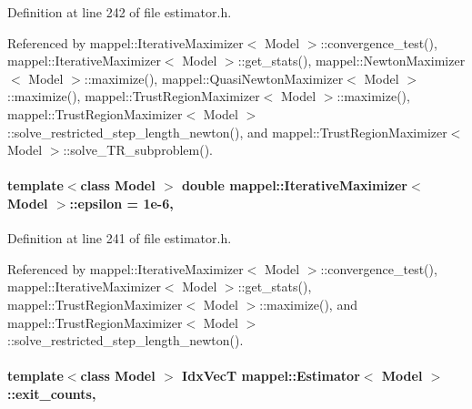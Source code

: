 Definition at line 242 of file estimator.\+h.



Referenced by mappel\+::\+Iterative\+Maximizer$<$ Model $>$\+::convergence\+\_\+test(), mappel\+::\+Iterative\+Maximizer$<$ Model $>$\+::get\+\_\+stats(), mappel\+::\+Newton\+Maximizer$<$ Model $>$\+::maximize(), mappel\+::\+Quasi\+Newton\+Maximizer$<$ Model $>$\+::maximize(), mappel\+::\+Trust\+Region\+Maximizer$<$ Model $>$\+::maximize(), mappel\+::\+Trust\+Region\+Maximizer$<$ Model $>$\+::solve\+\_\+restricted\+\_\+step\+\_\+length\+\_\+newton(), and mappel\+::\+Trust\+Region\+Maximizer$<$ Model $>$\+::solve\+\_\+\+T\+R\+\_\+subproblem().

\paragraph[{\texorpdfstring{epsilon}{epsilon}}]{\setlength{\rightskip}{0pt plus 5cm}template$<$class Model $>$ double {\bf mappel\+::\+Iterative\+Maximizer}$<$ Model $>$\+::epsilon = 1e-\/6\hspace{0.3cm}{\ttfamily [protected]}, {\ttfamily [inherited]}}\hypertarget{classmappel_1_1IterativeMaximizer_ae727ea0e3cab3924d21ebe9c12fec314}{}\label{classmappel_1_1IterativeMaximizer_ae727ea0e3cab3924d21ebe9c12fec314}


Definition at line 241 of file estimator.\+h.



Referenced by mappel\+::\+Iterative\+Maximizer$<$ Model $>$\+::convergence\+\_\+test(), mappel\+::\+Iterative\+Maximizer$<$ Model $>$\+::get\+\_\+stats(), mappel\+::\+Trust\+Region\+Maximizer$<$ Model $>$\+::maximize(), and mappel\+::\+Trust\+Region\+Maximizer$<$ Model $>$\+::solve\+\_\+restricted\+\_\+step\+\_\+length\+\_\+newton().

\paragraph[{\texorpdfstring{exit\+\_\+counts}{exit_counts}}]{\setlength{\rightskip}{0pt plus 5cm}template$<$class Model $>$ {\bf Idx\+VecT} {\bf mappel\+::\+Estimator}$<$ Model $>$\+::exit\+\_\+counts\hspace{0.3cm}{\ttfamily [protected]}, {\ttfamily [inherited]}}\hypertarget{classmappel_1_1Estimator_a490b648fdbd7ddae7ce41fbf26e29b48}{}\label{classmappel_1_1Estimator_a490b648fdbd7ddae7ce41fbf26e29b48}


